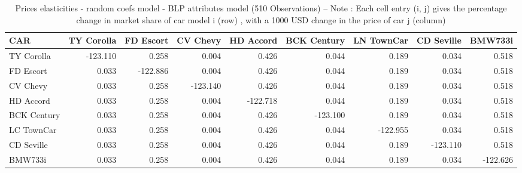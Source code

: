 \documentclass{article}\usepackage[]{graphicx}\usepackage[]{color}
\begin{document}
%

%
\begin{table}[ht]
\centering
\caption{Prices elasticities -  random coefs model - BLP attributes model 
 (510 Observations) 
  -- Note : Each cell entry (i, j) gives the percentage change in market share of car model i (row) , with a 1000 USD change in the price of car j (column)} 
\label{tbl:blp1_elasticities}
\begingroup\footnotesize
\begin{tabular}{lrrrrrrrr}
  \toprule 
 CAR & TY Corolla & FD Escort & CV Chevy & HD Accord &  BCK Century & LN TownCar & CD Seville & BMW733i \\
 \midrule 
 TY Corolla & -123.110 & 0.258 & 0.004 & 0.426 & 0.044 & 0.189 & 0.034 & 0.518 \\ 
  FD Escort & 0.033 & -122.886 & 0.004 & 0.426 & 0.044 & 0.189 & 0.034 & 0.518 \\ 
  CV Chevy & 0.033 & 0.258 & -123.140 & 0.426 & 0.044 & 0.189 & 0.034 & 0.518 \\ 
  HD Accord & 0.033 & 0.258 & 0.004 & -122.718 & 0.044 & 0.189 & 0.034 & 0.518 \\ 
  BCK Century & 0.033 & 0.258 & 0.004 & 0.426 & -123.100 & 0.189 & 0.034 & 0.518 \\ 
  LC TownCar & 0.033 & 0.258 & 0.004 & 0.426 & 0.044 & -122.955 & 0.034 & 0.518 \\ 
  CD Seville & 0.033 & 0.258 & 0.004 & 0.426 & 0.044 & 0.189 & -123.110 & 0.518 \\ 
  BMW733i & 0.033 & 0.258 & 0.004 & 0.426 & 0.044 & 0.189 & 0.034 & -122.626 \\ 
   \bottomrule 
\end{tabular}
\endgroup
\end{table}
\end{document}
